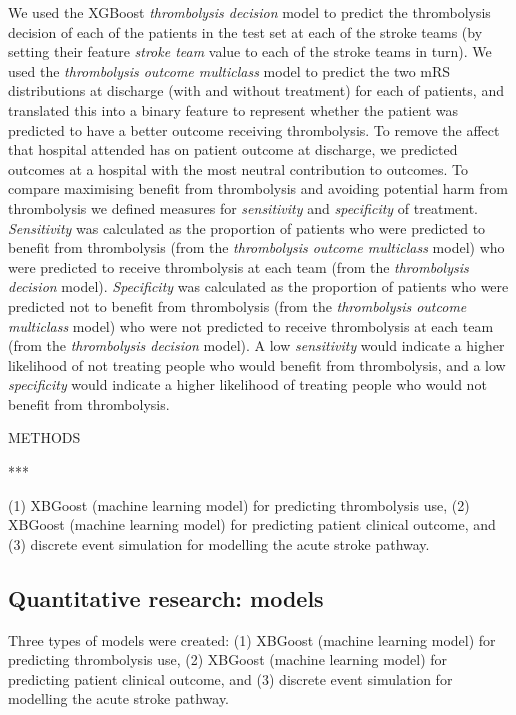 We used the XGBoost \textit{thrombolysis decision} model to predict the thrombolysis decision of each of the patients in the test set at each of the stroke teams (by setting their feature \textit{stroke team} value to each of the stroke teams in turn). We used the \textit{thrombolysis outcome multiclass} model to predict the two mRS distributions at discharge (with and without treatment) for each of patients, and translated this into a binary feature to represent whether the patient was predicted to have a better outcome receiving thrombolysis. To remove the affect that hospital attended has on patient outcome at discharge, we predicted outcomes at a hospital with the most neutral contribution to outcomes. To compare maximising benefit from thrombolysis and avoiding potential harm from thrombolysis we defined measures for \textit{sensitivity} and \textit{specificity} of treatment. \textit{Sensitivity} was calculated as the proportion of patients who were predicted to benefit from thrombolysis (from the \textit{thrombolysis outcome multiclass} model) who were predicted to receive thrombolysis at each team (from the \textit{thrombolysis decision} model). \textit{Specificity} was calculated as the proportion of patients who were predicted not to benefit from thrombolysis (from the \textit{thrombolysis outcome multiclass} model) who were not predicted to receive thrombolysis at each team (from the \textit{thrombolysis decision} model). A low \textit{sensitivity} would indicate a higher likelihood of not treating people who would benefit from thrombolysis, and a low \textit{specificity} would indicate a higher likelihood of treating people who would not benefit from thrombolysis.


METHODS


***


(1) XBGoost  \cite{chen_xgboost_2016} (machine learning model) for predicting thrombolysis use, (2) XBGoost (machine learning model) for predicting patient clinical outcome, and (3) discrete event simulation for modelling the acute stroke pathway. 


\subsection{Quantitative research: models}

Three types of models were created: (1) XBGoost  \cite{chen_xgboost_2016} (machine learning model) for predicting thrombolysis use, (2) XBGoost (machine learning model) for predicting patient clinical outcome, and (3) discrete event simulation for modelling the acute stroke pathway. 

